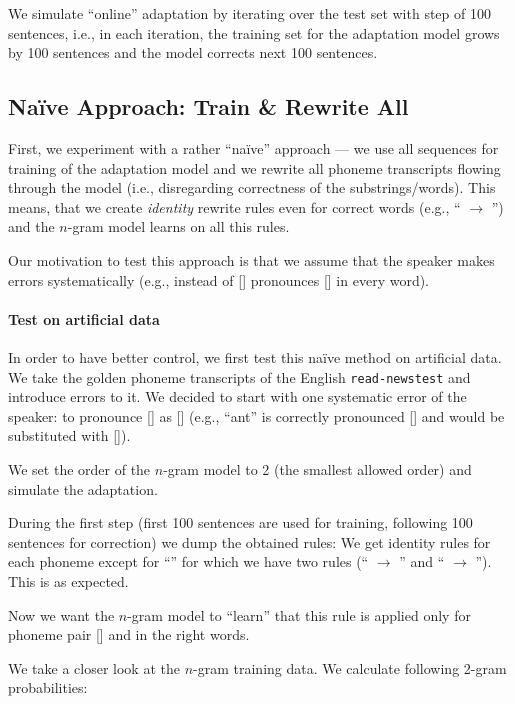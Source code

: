 We simulate ``online'' adaptation by iterating over the test set with step of 100 sentences, i.e., in each iteration, the training set for the adaptation model grows by 100 sentences and the model corrects next 100 sentences.

\subsection{Na\"ive Approach: Train \& Rewrite All}
First, we experiment with a rather ``na\"ive'' approach --- we use all sequences for training of the adaptation model and we rewrite all phoneme transcripts flowing through the model (i.e., disregarding correctness of the substrings/words). This means, that we create \emph{identity} rewrite rules even for correct words (e.g., `` $\rightarrow$ '') and the $n$-gram model learns on all this rules. 

Our motivation to test this approach is that we assume that the speaker makes errors systematically (e.g., instead of [] pronounces [] in every word).

\paragraph{Test on artificial data}
In order to have better control, we first test this na\"ive method on artificial data. We take the golden phoneme transcripts of the English \texttt{read-news\-test} and introduce errors to it. We decided to start with one systematic error of the speaker: to pronounce [] as [] (e.g., ``ant'' is correctly pronounced [] and would be substituted with []). 

We set the order of the $n$-gram model to 2 (the smallest allowed order) and simulate the adaptation. 

During the first step (first 100 sentences are used for training, following 100 sentences for correction) we dump the obtained rules: We get identity rules for each phoneme except for ``'' for which we have two rules (`` $\rightarrow$ '' and `` $\rightarrow$ ''). This is as expected. 

Now we want the $n$-gram model to ``learn'' that this rule is applied only for phoneme pair [] and in the right words.

We take a closer look at the $n$-gram training data. We calculate following 2-gram probabilities:	

